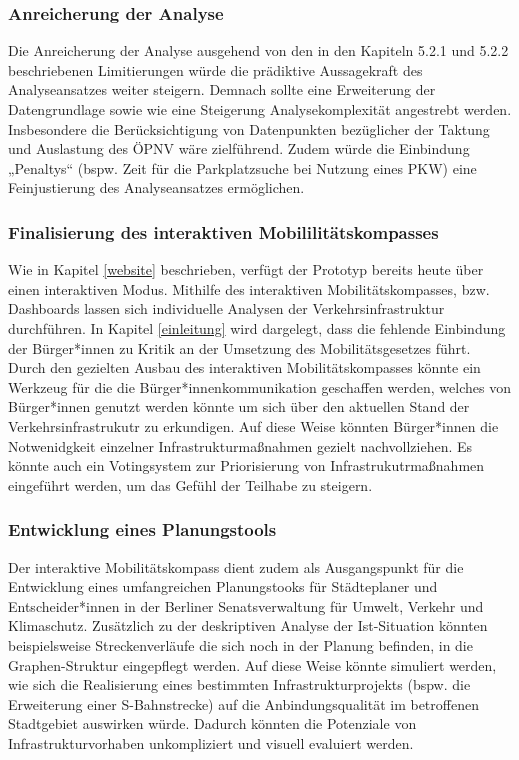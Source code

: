 \subsubsection{Anreicherung der Analyse}
Die Anreicherung der Analyse ausgehend von den in den Kapiteln 5.2.1 und 5.2.2 beschriebenen Limitierungen würde die prädiktive Aussagekraft des Analyseansatzes weiter steigern. Demnach sollte eine Erweiterung der Datengrundlage sowie wie eine Steigerung Analysekomplexität angestrebt werden. Insbesondere die Berücksichtigung von Datenpunkten bezüglicher der Taktung und Auslastung des ÖPNV wäre zielführend. Zudem würde die Einbindung „Penaltys“ (bspw. Zeit für die Parkplatzsuche bei Nutzung eines PKW) eine Feinjustierung des Analyseansatzes ermöglichen.


\subsubsection{Finalisierung des interaktiven Mobililitätskompasses}
Wie in Kapitel \ref{website} beschrieben, verfügt der Prototyp bereits heute über einen interaktiven Modus. Mithilfe des interaktiven Mobilitätskompasses, bzw. Dashboards lassen sich individuelle Analysen der Verkehrsinfrastruktur durchführen. In Kapitel \ref{einleitung} wird dargelegt, dass die fehlende Einbindung der Bürger*innen zu Kritik an der Umsetzung des Mobilitätsgesetzes führt. Durch den gezielten Ausbau des interaktiven Mobilitätskompasses könnte ein Werkzeug für die die Bürger*innenkommunikation geschaffen werden, welches von Bürger*innen genutzt werden könnte um sich über den aktuellen Stand der Verkehrsinfrastrukutr zu erkundigen. Auf diese Weise könnten Bürger*innen die Notwenidgkeit einzelner Infrastrukturmaßnahmen gezielt nachvollziehen. Es könnte auch ein Votingsystem zur Priorisierung von Infrastrukutrmaßnahmen eingeführt werden, um das Gefühl der Teilhabe zu steigern.



\subsubsection{Entwicklung eines Planungstools}
Der interaktive Mobilitätskompass dient zudem als Ausgangspunkt für die Entwicklung eines umfangreichen Planungstooks für Städteplaner und Entscheider*innen in der Berliner Senatsverwaltung für Umwelt, Verkehr und Klimaschutz. Zusätzlich zu der deskriptiven Analyse der Ist-Situation könnten beispielsweise Streckenverläufe die sich noch in der Planung befinden, in die Graphen-Struktur eingepflegt werden. Auf diese Weise könnte simuliert werden, wie sich die Realisierung eines bestimmten Infrastrukturprojekts (bspw. die Erweiterung einer S-Bahnstrecke) auf die Anbindungsqualität im betroffenen Stadtgebiet auswirken würde. Dadurch könnten die Potenziale von Infrastrukturvorhaben unkompliziert und visuell evaluiert werden.

